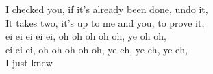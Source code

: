 I checked you, if it's already been done, undo it, \\
It takes two, it's up to me and you, to prove it, \\
ei ei ei ei ei, oh oh oh oh oh, ye oh oh, \\
ei ei ei, oh oh oh oh oh, ye eh, ye eh, ye eh, \\
I just knew